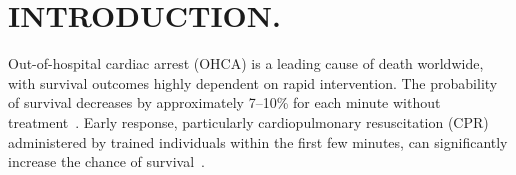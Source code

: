 \documentclass[stsy,sglanonrev]{informs4}
\begin{document}


\maketitle

%

\section{INTRODUCTION.}\label{sec:intro} 
Out-of-hospital cardiac arrest (OHCA) is a leading cause of death worldwide, with survival outcomes highly dependent on rapid intervention. The probability of survival decreases by approximately 7–10\% for each minute without treatment~\cite{baekgaard2017effects}. Early response, particularly cardiopulmonary resuscitation (CPR) administered by trained individuals within the first few minutes, can significantly increase the chance of survival~\cite{nichol1999cumulative, sasson2010predictors,yan2020global}.
\end{document}
